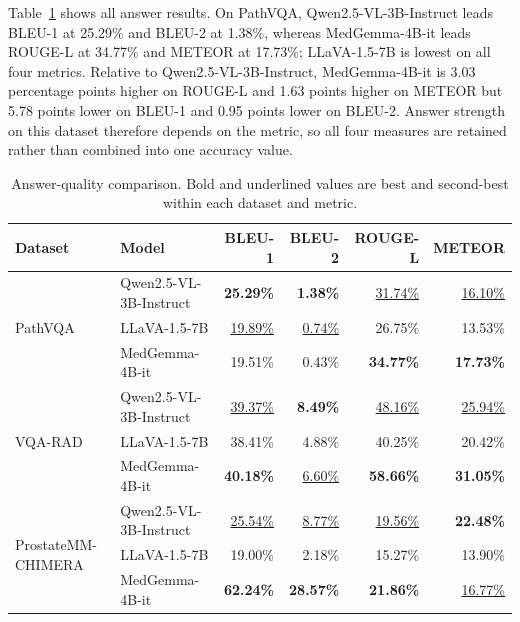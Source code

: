 Table~\ref{tab:answer-quality-all} shows all answer results. On PathVQA, Qwen2.5-VL-3B-Instruct leads BLEU-1 at 25.29\% and BLEU-2 at 1.38\%, whereas MedGemma-4B-it leads ROUGE-L at 34.77\% and METEOR at 17.73\%; LLaVA-1.5-7B is lowest on all four metrics. Relative to Qwen2.5-VL-3B-Instruct, MedGemma-4B-it is 3.03 percentage points higher on ROUGE-L and 1.63 points higher on METEOR but 5.78 points lower on BLEU-1 and 0.95 points lower on BLEU-2. Answer strength on this dataset therefore depends on the metric, so all four measures are retained rather than combined into one accuracy value.

\begin{table}[htbp]
    \centering
    \caption{Answer-quality comparison. Bold and underlined values are best and second-best within each dataset and metric.}
    \label{tab:answer-quality-all}
    \begin{tabularx}{\textwidth}{lXrrrr}
        \toprule
        Dataset & Model & BLEU-1 & BLEU-2 & ROUGE-L & METEOR \\
        \midrule
        \multirow{3}{*}{PathVQA}
        & Qwen2.5-VL-3B-Instruct & \textbf{25.29\%} & \textbf{1.38\%} & \underline{31.74\%} & \underline{16.10\%} \\
        & LLaVA-1.5-7B & \underline{19.89\%} & \underline{0.74\%} & 26.75\% & 13.53\% \\
        & MedGemma-4B-it & 19.51\% & 0.43\% & \textbf{34.77\%} & \textbf{17.73\%} \\
        \midrule
        \multirow{3}{*}{VQA-RAD}
        & Qwen2.5-VL-3B-Instruct & \underline{39.37\%} & \textbf{8.49\%} & \underline{48.16\%} & \underline{25.94\%} \\
        & LLaVA-1.5-7B & 38.41\% & 4.88\% & 40.25\% & 20.42\% \\
        & MedGemma-4B-it & \textbf{40.18\%} & \underline{6.60\%} & \textbf{58.66\%} & \textbf{31.05\%} \\
        \midrule
        \multirow{3}{*}{ProstateMM-CHIMERA}
        & Qwen2.5-VL-3B-Instruct & \underline{25.54\%} & \underline{8.77\%} & \underline{19.56\%} & \textbf{22.48\%} \\
        & LLaVA-1.5-7B & 19.00\% & 2.18\% & 15.27\% & 13.90\% \\
        & MedGemma-4B-it & \textbf{62.24\%} & \textbf{28.57\%} & \textbf{21.86\%} & \underline{16.77\%} \\
        \bottomrule
    \end{tabularx}
\end{table}

